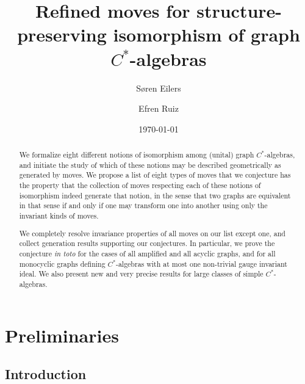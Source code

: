 \documentclass[12pt]{amsbook}%
\title[Refined moves for structure-preserving isomorphism]{Refined moves for structure-preserving isomorphism of graph $C^*$-algebras}
\author{S{\o}ren Eilers}
\author{Efren Ruiz}
\date{\today}
\theoremstyle{defin}
\theoremstyle{remark}
\numberwithin{equation}{chapter}
\numberwithin{theor}{section}
\begin{document}
\begin{abstract}
We formalize eight different notions of isomorphism among (unital) graph $C^*$-algebras, and initiate the study of which of these notions may be described geometrically as generated by moves. We propose a list of eight types of moves that we conjecture has the property that the collection of moves respecting each of these notions of isomorphism indeed generate that notion, in the sense that two graphs are equivalent in that sense if and only if one may transform one into another using only the invariant kinds of moves.

We completely resolve  invariance properties of all moves on our list except one, and collect generation results supporting our conjectures. In particular, we prove the conjecture \emph{in toto} for the cases of
all amplified and all 
 acyclic graphs, and for all monocyclic graphs defining $C^*$-algebras with at most one non-trivial gauge invariant ideal. We also present new and very precise results for large classes of simple $C^*$-algebras.
\end{abstract}
\maketitle

\newcommand{\companion}[1]{\cite[#1]{seaseer:gciugc}}

\tableofcontents




\chapter{Preliminaries}


\section{Introduction}
\end{document}
